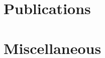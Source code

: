 \documentclass[11pt,a4paper,sans]{moderncv}  %
\begin{document}




%

\section{Publications}
\renewcommand{\refname}{Papers}
\nocite{*}


\section{Miscellaneous}

\end{document}
